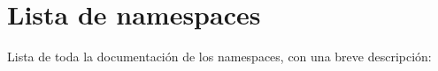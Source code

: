 \section{Lista de \textquotesingle{}namespaces\textquotesingle{}}
Lista de toda la documentación de los \textquotesingle{}namespaces\textquotesingle{}, con una breve descripción\+:\begin{DoxyCompactList}
\item{}
\end{DoxyCompactList}
